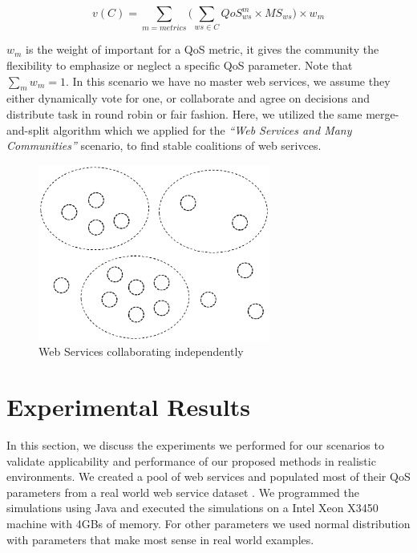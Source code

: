\documentclass[10pt, conference, compsocconf]{IEEEtran}
\theoremstyle{plain}
\theoremstyle{definition}
\begin{document}
\begin{equation}
v(C) = \sum_{m=metrics}{ \Big( \sum_{ws \in C}{QoS^m_{ws} \times MS_{ws} \Big) } \times w_{m} }
\end{equation} 

$w_m$ is the weight of important for a QoS metric, it gives the community the flexibility to emphasize or neglect a specific QoS parameter. Note that $ \sum_{m}{w_m} = 1 $. In this scenario we have no master web services, we assume they either dynamically vote for one, or collaborate and agree on decisions and distribute task in round robin or fair fashion. Here, we utilized the same merge-and-split algorithm which we applied for the \emph{``Web Services and Many Communities''} scenario, to find stable coalitions of web serivces.

\begin{figure}[!t]
\centering
\includegraphics[width=3in]{s3.eps}
\caption{Web Services collaborating independently}
\label{fig_sim}
\end{figure}

\section{Experimental Results}\label{s:resutls}

In this section, we discuss the experiments we performed for our scenarios to validate applicability and performance of our proposed methods in realistic environments. We created a pool of web services and populated most of their QoS parameters from a real world web service dataset \cite{DBLP:conf/smc/Al-MasriM09a}. We programmed the simulations using Java and executed the simulations on a Intel Xeon X3450 machine with 4GBs of memory. For other parameters we used normal distribution with parameters that make most sense in real world examples.
\end{document}
